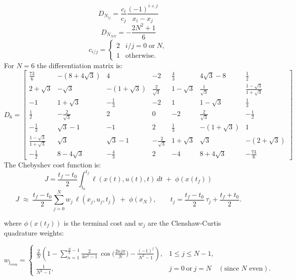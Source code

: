 \documentclass[]{article}
\begin{document}
	\[
       D_{N_{ij}}=\frac{c_i}{c_j}\frac{(-1)^{i+j}}{x_i-x_j}
        \]
	\[
       D_{N_{NN}}=-\frac{2N^2+1}{6}
        \]
	\[
        c_{i/j}=
        \begin{cases}
        2 & i/j = 0 \;\text{or}\; N, \\
        1 & \text{otherwise}.
        \end{cases}
        \]
For $N=6$ the differentiation matrix is:
        \[
        D_{6} =
        \begin{bmatrix}
        \frac{73}{6} & -(8+4\sqrt{3})  & 4 & -2 & \frac{4}{3} & 4\sqrt{3} - 8 & \frac{1}{2}\\
        2+\sqrt{3} & -\sqrt{3} & -(1+\sqrt{3}) & \frac{2}{\sqrt{3}} & 1-\sqrt{3} & \frac{1}{\sqrt{3}} & \frac{1-\sqrt{3}}{1+\sqrt{3}}\\
        -1 & 1+\sqrt{3} & -\frac{1}{3} & -2 & 1 & 1-\sqrt{3} & \frac{1}{3}\\
        \frac{1}{2} & -\frac{2}{\sqrt{3}} & 2 & 0 & -2 & \frac{2}{\sqrt{3}} & -\frac{1}{2}\\
        -\frac{1}{3} & \sqrt{3}-1 & -1 & 2 & \frac{1}{3} & -(1+\sqrt{3}) & 1\\
        \frac{1-\sqrt{3}}{1+\sqrt{3}} & \sqrt{3} & \sqrt{3}-1 & -\frac{2}{\sqrt{3}} & 1+\sqrt{3} & \sqrt{3} &-( 2+\sqrt{3})\\
        -\frac{1}{2} & 8-4\sqrt{3} & -\frac{4}{3} & 2 & -4 & 8+4\sqrt{3} &  -\frac{73}{6}
        \end{bmatrix}
        \]
        The Chebyshev cost function is:
        	\[
	J=\frac{t_f-t_0}{2}\int_{t_0}^{t_f} \ell(x(t),u(t),t)\,dt \;+\; \phi(x(t_f))
        \]
        \[
        J \;\approx\; \frac{t_f-t_0}{2} \sum_{j=0}^{N} w_j \,\ell(x_j,u_j,t_j)
        \;+\; \phi(x_N),
        \qquad t_j = \frac{t_f-t_0}{2}\,\tau_j + \frac{t_f+t_0}{2}.
        \]
        	
        where $\phi(x(t_f))$ is the terminal cost and  $w_j$ are the Clenshaw-Curtis quadrature weights:

        \[
        w_{\mathrm{j_{even}}} =
        \begin{cases}
        \displaystyle
        \frac{2}{N}\!\left(
        1 - \sum_{n=1}^{\frac{N}{2}-1} \frac{2}{4n^{2}-1}\,
        \cos\!\Big(\tfrac{2 n j \pi}{N}\Big)
        -\frac{(-1)^{j}}{N^{2}-1}
        \right), & 1 \le j \le N-1, \\[2.0ex]
        \displaystyle \frac{1}{N^{2}-1}, & j=0\ \text{or}\ j=N \quad(\text{since \(N\) even}).
        \end{cases}
        \]
\end{document}
